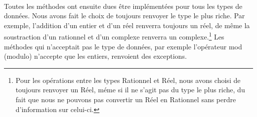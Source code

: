 \documentclass[a4paper,12pt]{article}
\begin{document}
		\paragraph{}Toutes les méthodes ont ensuite dues être implémentées pour tous les types de données. Nous avons fait le choix de toujours renvoyer le type le plus riche. Par exemple, l'addition d'un entier et d'un réel renverra toujours un réel, de même la soustraction d'un rationnel et d'un complexe renverra un complexe.\footnote{Pour les opérations entre les types Rationnel et Réel, nous avons choisi de toujours renvoyer un Réel, méme si il ne s'agit pas du type le plus riche, du fait que nous ne pouvons pas convertir un Réel en Rationnel sans perdre d'information sur celui-ci.} Les méthodes qui n'acceptait pas le type de données, par exemple l'opérateur mod (modulo) n'accepte que les entiers, renvoient des exceptions.
\end{document}
